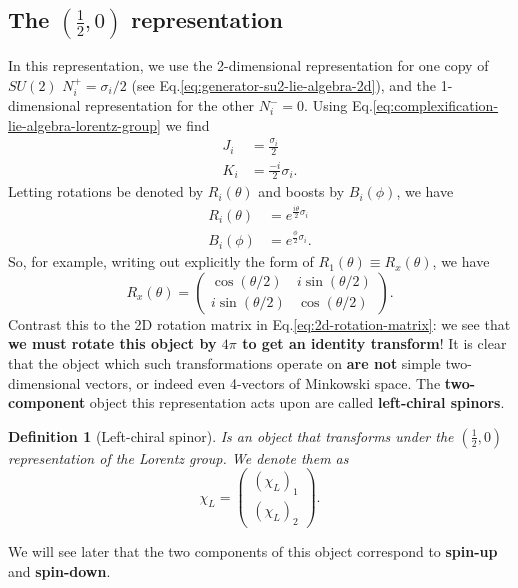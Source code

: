 \documentclass[11pt]{article}
\numberwithin{equation}{section}
\newtheorem{defn}{Definition}[section]
\begin{document}
\subsection{The $(\frac{1}{2},0)$ representation}
In this representation, we use the 2-dimensional representation for one copy of $SU(2)$ $N_i^+ = \sigma_i/2$ (see Eq.\eqref{eq:generator-su2-lie-algebra-2d}), and the 1-dimensional representation for the other $N_i^-=0$. Using Eq.\eqref{eq:complexification-lie-algebra-lorentz-group} we find
\begin{align}
J_i &= \frac{\sigma_i}{2} \\
K_i &= \frac{-i}{2} \sigma_i.
\end{align}
Letting rotations be denoted by $R_i(\theta)$ and boosts by $B_i(\phi)$, we have
\begin{align}
R_i(\theta) &= e^{\frac{i \theta}{2}  \sigma_i} \\
B_i(\phi) &= e^{\frac{\phi}{2}  \sigma_i}.
\end{align}
So, for example, writing out explicitly the form of $R_1(\theta) \equiv R_x(\theta)$, we have
\begin{equation}
R_x(\theta) = \begin{pmatrix}
\cos(\theta/2) & i \sin(\theta/2) \\
i \sin(\theta/2) & \cos(\theta/2)
\end{pmatrix}. \label{eq:rotation-left-chiral-lorentz-tfm}
\end{equation}
Contrast this to the 2D rotation matrix in Eq.\eqref{eq:2d-rotation-matrix}: we see that \textbf{we must rotate this object by $4\pi$ to get an identity transform}! It is clear that the object which such transformations operate on \textbf{are not} simple two-dimensional vectors, or indeed even 4-vectors of Minkowski space. The \textbf{two-component} object  this representation acts upon are called \textbf{left-chiral spinors}.
\begin{defn}[Left-chiral spinor]
Is an object that transforms under the $(\frac{1}{2},0)$ representation of the Lorentz group. We denote them as 
\begin{equation}
\chi_L = \begin{pmatrix}
(\chi_L)_1 \\
(\chi_L)_2 
\end{pmatrix}.
\end{equation}
\end{defn}
\noindent We will see later that the two components of this object correspond to \textbf{spin-up} and \textbf{spin-down}. 
\end{document}
